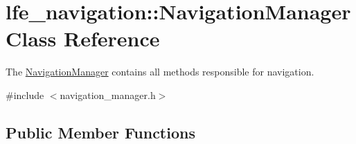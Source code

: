 \hypertarget{classlfe__navigation_1_1NavigationManager}{}\section{lfe\+\_\+navigation\+:\+:Navigation\+Manager Class Reference}
\label{classlfe__navigation_1_1NavigationManager}


The \hyperlink{classlfe__navigation_1_1NavigationManager}{Navigation\+Manager} contains all methods responsible for navigation.  




{\ttfamily \#include $<$navigation\+\_\+manager.\+h$>$}

\subsection*{Public Member Functions}
